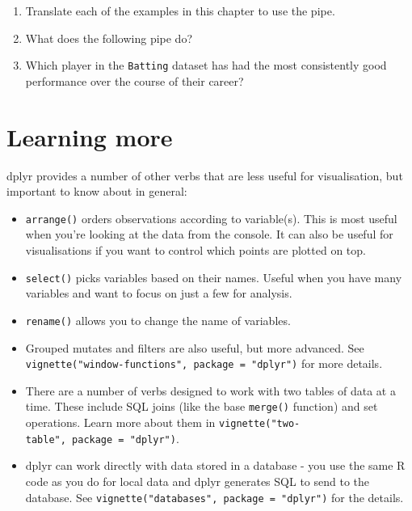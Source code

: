 \begin{enumerate}
\def\labelenumi{\arabic{enumi}.}
\item
  Translate each of the examples in this chapter to use the pipe.
\item
  What does the following pipe do?

\begin{Shaded}
\end{Shaded}
\item
  Which player in the \texttt{Batting} dataset has had the most
  consistently good performance over the course of their career?
\end{enumerate}

\section{Learning more}\label{learning-more}

dplyr provides a number of other verbs that are less useful for
visualisation, but important to know about in general:

\begin{itemize}
\item
  \texttt{arrange()} orders observations according to variable(s). This
  is most useful when you're looking at the data from the console. It
  can also be useful for visualisations if you want to control which
  points are plotted on top.
\item
  \texttt{select()} picks variables based on their names. Useful when
  you have many variables and want to focus on just a few for analysis.
\item
  \texttt{rename()} allows you to change the name of variables.
\item
  Grouped mutates and filters are also useful, but more advanced. See
  \texttt{vignette("window-functions",\ package\ =\ "dplyr")} for more
  details.
\item
  There are a number of verbs designed to work with two tables of data
  at a time. These include SQL joins (like the base \texttt{merge()}
  function) and set operations. Learn more about them in
  \texttt{vignette("two-table",\ package\ =\ "dplyr")}.
\item
  dplyr can work directly with data stored in a database - you use the
  same R code as you do for local data and dplyr generates SQL to send
  to the database. See
  \texttt{vignette("databases",\ package\ =\ "dplyr")} for the details.
\end{itemize}

